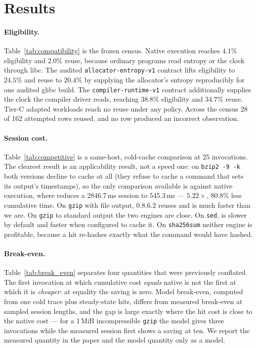\section{Results}
\label{sec:results}



\paragraph{Eligibility.}
Table~\ref{tab:compatibility} is the frozen census. Native execution reaches $4.1\%$ eligibility
and $2.0\%$ reuse, because ordinary programs read entropy or the clock through libc. The audited
\texttt{allocator-entropy-v1} contract lifts eligibility to $24.5\%$ and reuse to $20.4\%$ by
supplying the allocator's entropy reproducibly for one audited glibc build. The
\texttt{compiler-runtime-v1} contract additionally supplies the clock the compiler driver reads,
reaching $38.8\%$ eligibility and $34.7\%$ reuse. Tier-C adapted workloads reach no reuse under any
policy. Across the census 28 of 162 attempted rows reused, and no row produced an incorrect
observation.



\paragraph{Session cost.}
Table~\ref{tab:competitive} is a same-host, cold-cache comparison at 25 invocations. The clearest
result is an applicability result, not a speed one: on \texttt{bzip2 -9 -k} both \firebuild{}
versions decline to cache at all (they refuse to cache a command that sets its output's
timestamps), so the only comparison available is against native execution, where \tracejit{}
reduces a 2846.7\,ms session to 545.3\,ms --- $5.22\times$, $80.8\%$ less cumulative time. On
\texttt{gzip} with file output, \firebuild{} 0.8.6.2 reuses and is much faster than we are. On
\texttt{gzip} to standard output the two engines are close. On \texttt{sed}, \firebuild{} is slower
by default and faster when configured to cache it. On \texttt{sha256sum} neither engine is
profitable, because a hit re-hashes exactly what the command would have hashed.



\paragraph{Break-even.}
Table~\ref{tab:break_even} separates four quantities that were previously conflated. The first
invocation at which cumulative cost \emph{equals} native is not the first at which it is
\emph{cheaper}: at equality the saving is zero. Model break-even, computed from one cold trace plus
steady-state hits, differs from measured break-even at sampled session lengths, and the gap is
large exactly where the hit cost is close to the native cost --- for a 1\,MiB incompressible
\texttt{gzip} the model gives three invocations while the measured session first shows a saving at
ten. We report the measured quantity in the paper and the model quantity only as a model.

